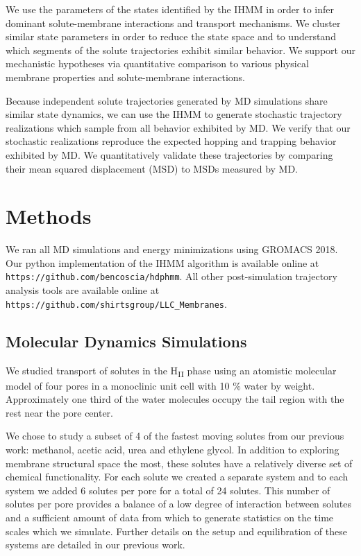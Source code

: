 \documentclass{article}
\begin{document}
  We use the parameters of the states identified by the IHMM in order to infer 
  dominant solute-membrane interactions and transport mechanisms. We cluster similar 
  state parameters in order to reduce the state space and to understand which segments 
  of the solute trajectories exhibit similar behavior. We support our mechanistic 
  hypotheses via quantitative comparison to various physical membrane properties and
  solute-membrane interactions.
  
  Because independent solute trajectories generated by MD simulations share 
  similar state dynamics, we can use the IHMM to generate stochastic trajectory 
  realizations which sample from all behavior exhibited by MD. We verify that our
  stochastic realizations reproduce the expected hopping and trapping behavior 
  exhibited by MD. We quantitatively validate these trajectories by comparing 
  their mean squared displacement (MSD) to MSDs measured by MD.
    
  \section{Methods}
    
  We ran all MD simulations and energy minimizations using GROMACS 2018. Our 
  python implementation of the IHMM algorithm is available online at 
  \texttt{https://github.com/bencoscia/hdphmm}. All other post-simulation 
  trajectory analysis tools are available online at \texttt{https://github.com/shirtsgroup/LLC\_Membranes}.

  \subsection{Molecular Dynamics Simulations}

  We studied transport of solutes in the H\textsubscript{II} phase using an
  atomistic molecular model of four pores in a monoclinic unit cell with 
  10 \% water by weight. Approximately one third of the water molecules 
  occupy the tail region with the rest near the pore center.
  
  We chose to study a subset of 4 of the fastest moving solutes from our previous
  work: methanol, acetic acid, urea and ethylene glycol. In addition to exploring
  membrane structural space the most, these solutes have a relatively diverse set
  of chemical functionality. For each solute we created a separate system and to 
  each system we added 6 solutes per pore for a total of 24 solutes. This number 
  of solutes per pore provides a balance of a low degree of interaction between 
  solutes and a sufficient amount of data from which to generate statistics on the
  time scales which we simulate. Further details on the setup and equilibration of
  these systems are detailed in our previous work.\cite{coscia_chemically_2019}
  
\end{document}
